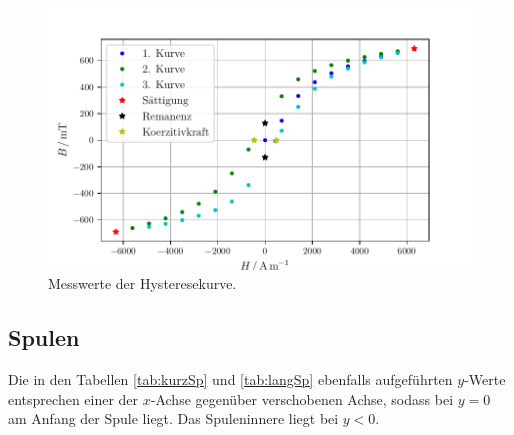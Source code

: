 \begin{figure}
    \centering
    \includegraphics[width=\textwidth]{Plots/plot_Hysterese.pdf}
    \caption{Messwerte der Hysteresekurve.}
    \label{fig:hyst}
\end{figure}
\pagebreak

\subsection{Spulen}
    Die in den Tabellen \ref{tab:kurzSp} und \ref{tab:langSp} ebenfalls aufgeführten $y$-Werte entsprechen einer der $x$-Achse gegenüber verschobenen Achse, sodass
    bei $y=0$ am Anfang der Spule liegt. Das Spuleninnere liegt bei $y<0$.
